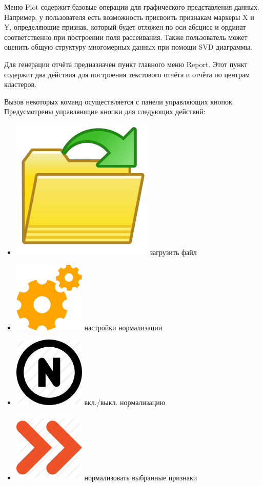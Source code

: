\documentclass[12pt]{diploma}
\begin{document}
	Меню Plot содержит базовые операции для графического представления данных. Например, у пользователя есть возможность присвоить признакам маркеры X и Y, определяющие признак, который будет отложен по оси абсцисс и ординат соответственно при построении поля рассеивания. Также пользователь может оценить общую структуру многомерных данных при помощи SVD диаграммы. 
	
	Для генерации отчёта предназначен пункт главного меню Report. Этот пункт содержит два действия для построения текстового отчёта и отчёта по центрам кластеров.
	
	Вызов некоторых команд осуществляется с панели управляющих кнопок. Предусмотрены управляющие кнопки для следующих действий:
	\begin{itemize}
		\item \includegraphics[scale=0.05]{img/folder-ico} загрузить файл
		\item \includegraphics[scale=0.1]{img/settings} настройки нормализации
		\item \includegraphics[scale=0.05]{img/norm} вкл./выкл. нормализацию
		\item \includegraphics[scale=0.1]{img/norm_all} нормализовать выбранные признаки

\end{itemize}
\end{document}
